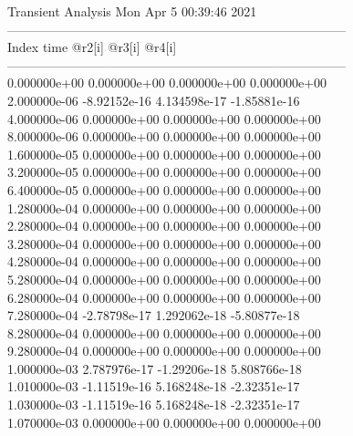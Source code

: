                                    Transient Analysis  Mon Apr  5 00:39:46  2021\\ \hline
--------------------------------------------------------------------------------\\ \hline
Index   time            @r2[i]          @r3[i]          @r4[i]          \\ \hline
--------------------------------------------------------------------------------\\ 	0.000000e+00	0.000000e+00	0.000000e+00	0.000000e+00	\\ 	2.000000e-06	-8.92152e-16	4.134598e-17	-1.85881e-16	\\ 	4.000000e-06	0.000000e+00	0.000000e+00	0.000000e+00	\\ 	8.000000e-06	0.000000e+00	0.000000e+00	0.000000e+00	\\ 	1.600000e-05	0.000000e+00	0.000000e+00	0.000000e+00	\\ 	3.200000e-05	0.000000e+00	0.000000e+00	0.000000e+00	\\ 	6.400000e-05	0.000000e+00	0.000000e+00	0.000000e+00	\\ 	1.280000e-04	0.000000e+00	0.000000e+00	0.000000e+00	\\ 	2.280000e-04	0.000000e+00	0.000000e+00	0.000000e+00	\\ 	3.280000e-04	0.000000e+00	0.000000e+00	0.000000e+00	\\ 	4.280000e-04	0.000000e+00	0.000000e+00	0.000000e+00	\\ 	5.280000e-04	0.000000e+00	0.000000e+00	0.000000e+00	\\ 	6.280000e-04	0.000000e+00	0.000000e+00	0.000000e+00	\\ 	7.280000e-04	-2.78798e-17	1.292062e-18	-5.80877e-18	\\ 	8.280000e-04	0.000000e+00	0.000000e+00	0.000000e+00	\\ 	9.280000e-04	0.000000e+00	0.000000e+00	0.000000e+00	\\ 	1.000000e-03	2.787976e-17	-1.29206e-18	5.808766e-18	\\ 	1.010000e-03	-1.11519e-16	5.168248e-18	-2.32351e-17	\\ 	1.030000e-03	-1.11519e-16	5.168248e-18	-2.32351e-17	\\ 	1.070000e-03	0.000000e+00	0.000000e+00	0.000000e+00	\\ \hline
